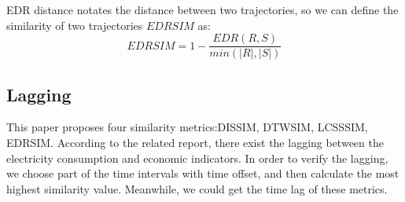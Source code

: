 EDR distance notates the distance between two trajectories, so we can define the similarity of two trajectories $EDRSIM$ as:
\begin{equation}
	EDRSIM=1 - \frac{EDR(R,S)}{min(|R|, |S|)}
\end{equation} 
\subsection{Lagging}
This paper proposes four similarity metrics:DISSIM, DTWSIM, LCSSSIM, EDRSIM. According to the related report, there exist the lagging between the electricity consumption and economic indicators. In order to verify the lagging, we choose part of the time intervals with time offset, and then calculate the most highest similarity value. Meanwhile, we could get the time lag of these metrics. 
